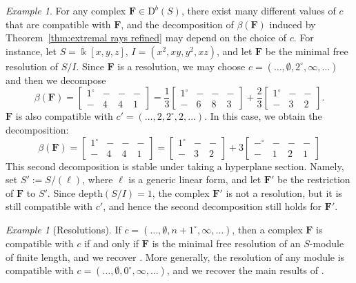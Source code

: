 \documentclass[12pt]{amsart}
\theoremstyle{definition}
\theoremstyle{remark}
\newtheorem{example}[lemma]{Example}
\newcommand{\kk}{\Bbbk}
\newcommand{\cc}{c}
\newcommand{\FF}{\mathbf{F}}
\newcommand{\zp}{\circ}
\newcommand{\nothing}{\emptyset}
\newcommand{\DD}{\mathrm{D}}
\begin{document}
\begin{example}\label{example:many decompositions}
For any complex $\FF\in \DD^b(S)$, there exist many different values of $\cc$ that are compatible with $\FF$, and the decomposition of $\beta(\FF)$ induced by Theorem~\ref{thm:extremal rays refined} may depend on the choice of $\cc$.   For instance, let $S=\kk[x,y,z]$, $I=(x^2,xy,y^2,xz)$, and let $\FF$ be the minimal free resolution of $S/I$.  Since $\FF$ is a resolution, we may choose $\cc=(\dots, \nothing, 2^\zp, \infty, \dots)$ and then we decompose
\[
\beta(\FF)=\begin{bmatrix}
1^\zp&-&-&-\\
-&4&4&1
\end{bmatrix}
=
\frac{1}{3}
\begin{bmatrix}
1^\zp&-&-&-\\
-&6&8&3
\end{bmatrix}
+\frac{2}{3}
\begin{bmatrix}
1^\zp&-&-\\
-&3&2
\end{bmatrix}.
\]
$\FF$ is also compatible with $\cc'=(\dots, 2, 2^\zp, 2, \dots)$.  In this case, we obtain the decomposition:
\[
\beta(\FF)=
\begin{bmatrix}
1^\zp&-&-&-\\
-&4&4&1
\end{bmatrix}
=\begin{bmatrix}1^\zp&-&-\\-&3&2\end{bmatrix}
+
3\begin{bmatrix}
-^\zp&-&-&-\\
-&1&2&1
\end{bmatrix}
\] 
This second decomposition is stable under taking a hyperplane section.  Namely, set $S':=S/(\ell)$, where $\ell$ is a generic linear form, and let $\FF'$ be the restriction of $\FF$ to $S'$.  Since $\text{depth}(S/I)=1$, the complex $\FF'$ is not a resolution, but it is still compatible with $\cc'$, and hence the second decomposition still holds for $\FF'$.
\end{example}

\begin{example}[Resolutions]\label{ex:resolutions}
 If  $\cc=(\dots, \nothing, n+1^\zp, \infty, \dots)$, then a complex $\FF$ is compatible with $\cc$ if and only if $\FF$ is the minimal free resolution of an $S$-module of finite length, and we recover \cite[Theorem~0.2]{eis-schrey1}. More generally, the resolution of any module is compatible with
$\cc=(\dots, \nothing, 0^\zp, \infty, \dots)$, and we recover the main results of \cite{boij-sod2}. 
\end{example}
\end{document}
